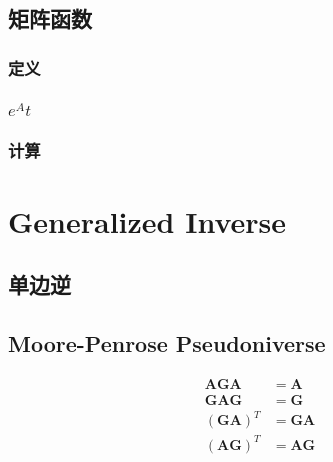 \documentclass[UTF8]{../../09-Mathematics}
\begin{document}
\section{矩阵函数}

\subsection{定义}
\subsection{$e^At$}
\subsection{计算}




\chapter{Generalized Inverse}


\section{单边逆}

\section{Moore-Penrose Pseudoniverse}

$$
\begin{aligned}
    \boldsymbol A \boldsymbol G \boldsymbol A &= \boldsymbol A\\
    \boldsymbol G \boldsymbol A \boldsymbol G &= \boldsymbol G\\
    (\boldsymbol G \boldsymbol A )^T &= \boldsymbol G \boldsymbol A\\
    (\boldsymbol A \boldsymbol G )^T &= \boldsymbol A \boldsymbol G\\
\end{aligned}
$$
\end{document}
